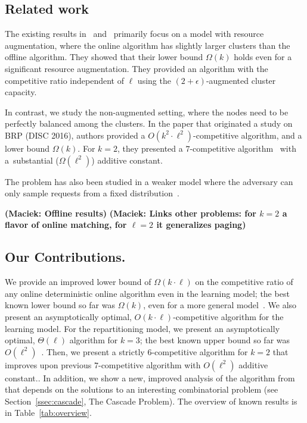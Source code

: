 \documentclass[manuscript,screen=true, review, anonymous]{acmart}
\newcommand\maciek[1]{\color{brown}\textbf{(Maciek: #1)}\color{black}}
\begin{document}
\subsection{Related work}


The existing results in~\cite{repartition-disc} and~\cite{sigmetrics19_partitioning} primarily focus on a model with resource augmentation, where  the online algorithm has slightly larger clusters than the offline algorithm.
They showed that their lower bound $\Omega(k)$ holds even for a significant resource augmentation.
They provided an algorithm with the competitive ratio independent of $\ell$ using the $(2+\epsilon)$-augmented cluster capacity.


In contrast, we study the non-augmented setting, where the nodes need to be perfectly balanced  among the clusters.
In the paper that originated a study on BRP \cite{repartition-disc} (DISC 2016), authors provided a $O(k^2 \cdot \ell^2)$-competitive algorithm, and a lower bound $\Omega(k)$.
For $k=2$, they presented a $7$-competitive algorithm~\cite{repartition-disc} with a~substantial ($\Omega(\ell^2)$) additive constant.


The problem has also been studied in a weaker
model where the adversary can only sample
requests from a fixed distribution~\cite{stochastic-ring}.



\maciek{Offline results}
\maciek{Links other problems: for $k=2$ a flavor of online matching, for $\ell = 2$ it generalizes paging}


\subsection{Our Contributions.}
We provide an improved lower bound 
of $\Omega(k\cdot\ell)$ on the competitive ratio of any online deterministic online algorithm 
even in the learning model;
the best known lower bound so far was $\Omega(k)$,
even for a more general model~\cite{repartition-disc}.
We also present an asymptotically optimal, 
$O(k\cdot \ell)$-competitive algorithm
for the learning model.
For the repartitioning model, we present  
an asymptotically optimal,
$\Theta(\ell)$ algorithm for $k=3$;
the best known upper bound 
so far was $O(\ell^2)$~\cite{repartition-disc}.
Then, we present a strictly $6$-competitive algorithm for $k=2$ that improves upon previous $7$-competitive algorithm with $O(\ell^2)$ additive constant..
In addition, we show a new, improved analysis of the algorithm from \cite{repartition-disc} that depends on the solutions to an interesting combinatorial problem (see Section~\ref{ssec:cascade}, The Cascade Problem).
%
The overview of known results is in Table~\ref{tab:overview}.
\end{document}
